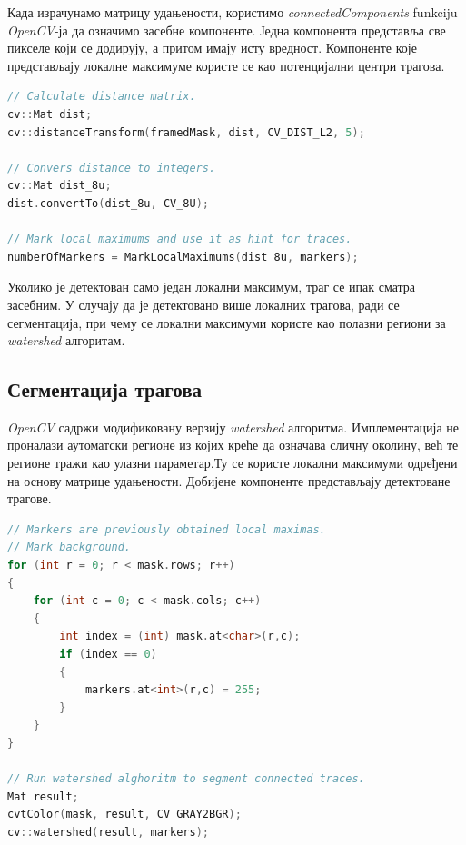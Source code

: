 \documentclass[11pt,a4paper,serbian,oneside]{book}
\begin{document}
Када израчунамо матрицу удањености, користимо \textit{connectedComponents} funkciju \textit{OpenCV}-ја да означимо засебне компоненте. Једна компонента представља све пикселе који се додирују, а притом имају исту вредност. Компоненте које представљају локалне максимуме користе се као потенцијални центри трагова.

 \begin{lstlisting}[language=C++,label=lst:local_maxima,caption=Проналажење централних региона трагова]
// Calculate distance matrix.
cv::Mat dist;
cv::distanceTransform(framedMask, dist, CV_DIST_L2, 5);

// Convers distance to integers.
cv::Mat dist_8u;
dist.convertTo(dist_8u, CV_8U);

// Mark local maximums and use it as hint for traces.
numberOfMarkers = MarkLocalMaximums(dist_8u, markers);
\end{lstlisting}

Уколико је детектован само један локални максимум, траг се ипак сматра засебним. У случају да је детектовано више локалних трагова, ради се сегментација, при чему се  локални максимуми користе као полазни региони за \textit{watershed} алгоритам.

\subsection{Сегментација трагова}

\textit{OpenCV} садржи модификовану верзију \textit{watershed} алгоритма. Имплементација не проналази аутоматски регионе из којих креће да означава сличну околину, већ те регионе тражи као улазни параметар.Ту се користе локални максимуми одређени на основу матрице удањености. Добијене компоненте представљају детектоване трагове.

 \begin{lstlisting}[language=C++,label=lst:grayscaleOtsu,caption=Сегментација трагова]
// Markers are previously obtained local maximas.
// Mark background.
for (int r = 0; r < mask.rows; r++)
{
    for (int c = 0; c < mask.cols; c++)
    {
        int index = (int) mask.at<char>(r,c);
        if (index == 0)
        {
            markers.at<int>(r,c) = 255;
        }
    }
}

// Run watershed alghoritm to segment connected traces.
Mat result;
cvtColor(mask, result, CV_GRAY2BGR);
cv::watershed(result, markers);
\end{lstlisting}
\end{document}
